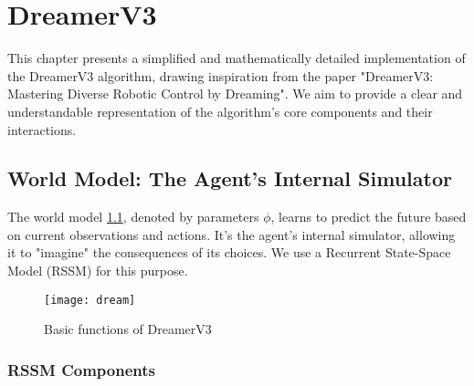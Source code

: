 \chapter{DreamerV3}

This chapter presents a simplified and mathematically detailed implementation of the DreamerV3 algorithm, drawing inspiration from the paper "DreamerV3: Mastering Diverse Robotic Control by Dreaming".  We aim to provide a clear and understandable representation of the algorithm's core components and their interactions.

\section{World Model: The Agent's Internal Simulator}

The world model \ref{fig:dream}, denoted by parameters $\phi$, learns to predict the future based on current observations and actions. It's the agent's internal simulator, allowing it to "imagine" the consequences of its choices.  We use a Recurrent State-Space Model (RSSM) for this purpose.

\begin{figure}
    \centering
    \texttt{[image: dream]}
    \caption{Basic functions of DreamerV3}
    \label{fig:dream}
\end{figure}

\subsection{RSSM Components}

